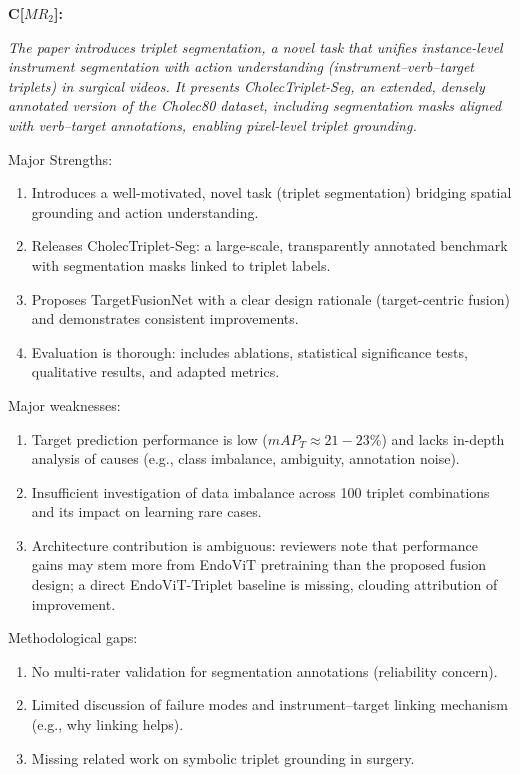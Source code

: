 \documentclass{article}
\begin{document}
\vspace{4mm}
\textbf{C[$MR_{2}$]:} {\it
The paper introduces triplet segmentation, a novel task that unifies instance-level instrument segmentation with action understanding (instrument–verb–target triplets) in surgical videos. It presents CholecTriplet-Seg, an extended, densely annotated version of the Cholec80 dataset, including segmentation masks aligned with verb–target annotations, enabling pixel-level triplet grounding.

Major Strengths:
\begin{enumerate}
\item Introduces a well-motivated, novel task (triplet segmentation) bridging spatial grounding and action understanding.
\item Releases CholecTriplet-Seg: a large-scale, transparently annotated benchmark with segmentation masks linked to triplet labels.
\item Proposes TargetFusionNet with a clear design rationale (target-centric fusion) and demonstrates consistent improvements.
\item Evaluation is thorough: includes ablations, statistical significance tests, qualitative results, and adapted metrics.
\end{enumerate}

Major weaknesses:
\begin{enumerate}
\item Target prediction performance is low ($mAP_T \approx 21-23\%$) and lacks in-depth analysis of causes (e.g., class imbalance, ambiguity, annotation noise).
\item Insufficient investigation of data imbalance across 100 triplet combinations and its impact on learning rare cases.
\item Architecture contribution is ambiguous: reviewers note that performance gains may stem more from EndoViT pretraining than the proposed fusion design; a direct EndoViT-Triplet baseline is missing, clouding attribution of improvement.
\end{enumerate}

Methodological gaps:
\begin{enumerate}
\item No multi-rater validation for segmentation annotations (reliability concern).
\item Limited discussion of failure modes and instrument–target linking mechanism (e.g., why linking helps).
\item Missing related work on symbolic triplet grounding in surgery.
\end{enumerate}
\vspace{2mm}
}
\end{document}
